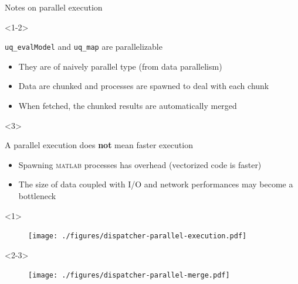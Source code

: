 \documentclass[]{rsuqbeamernew}
\begin{document}
\begin{frame}[fragile]{Notes on parallel execution}
  
\begin{onlyenv}<1-2>
\begin{block}{\texttt{uq\_evalModel} and \texttt{uq\_map} are parallelizable}
\begin{itemize}
  \item They are of {\altx naively parallel} type (from data parallelism)
  \item Data are {\altx chunked}
        and processes are {\altx spawned} to deal with each chunk
  \item<2> When fetched, the chunked results are automatically {\altx merged}
\end{itemize}
\end{block}
\end{onlyenv}

\begin{onlyenv}<3>
\begin{block}{A parallel execution does \textbf{not} mean faster execution}
\begin{itemize}
  \item Spawning \textsc{matlab} processes has overhead (vectorized code is faster)
  \item The size of data coupled with I/O and network performances may become a bottleneck
\end{itemize}
\end{block}
\end{onlyenv}

\begin{onlyenv}<1>
\begin{figure}[htbp]
  \texttt{[image: ./figures/dispatcher-parallel-execution.pdf]}
\end{figure}
\end{onlyenv}

\begin{onlyenv}<2-3>
\begin{figure}[htbp]
  \texttt{[image: ./figures/dispatcher-parallel-merge.pdf]}
\end{figure}
\end{onlyenv}

\end{frame}
\end{document}
